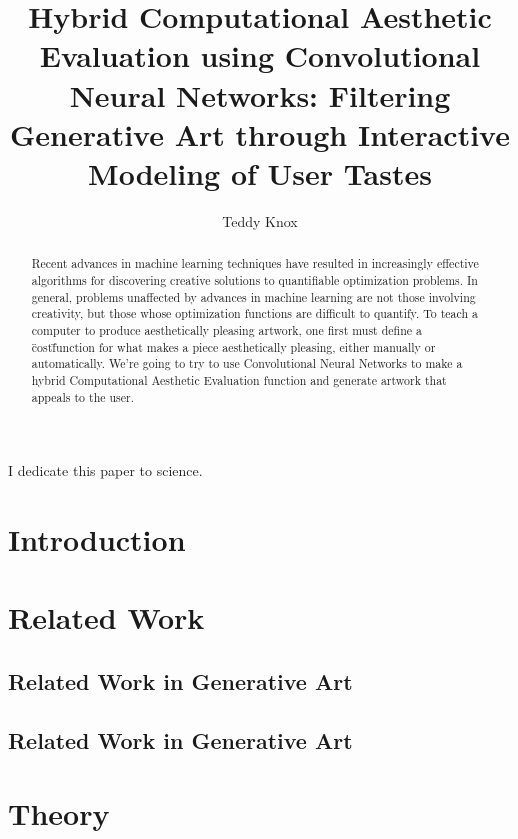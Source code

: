 \documentclass[midd]{thesis}
\title {Hybrid Computational Aesthetic Evaluation using Convolutional Neural Networks: Filtering Generative Art through Interactive Modeling of User Tastes}
\author {Teddy Knox}
\begin{document}
\maketitle

\begin{abstract}
Recent advances in machine learning techniques have resulted in increasingly effective algorithms for discovering creative
solutions to quantifiable optimization problems. In general, problems unaffected by advances in machine learning are not
those involving creativity, but those whose optimization functions are difficult to quantify. To teach a computer to
produce aesthetically pleasing artwork, one first must define a \"cost\" function for what makes a piece aesthetically
pleasing, either manually or automatically. We're going to try to use Convolutional Neural Networks to make a hybrid
Computational Aesthetic Evaluation function and generate artwork that appeals to the user.
\end{abstract}

\begin{acknowledgements}
I dedicate this paper to science.
\end{acknowledgements}

\contentspage
\tablelistpage
\figurelistpage

\normalspacing \setcounter{page}{1} 

\chapter{Introduction}
\label{sec:intro}

\chapter{Related Work}

\section{Related Work in Generative Art}

\section{Related Work in Generative Art}

\chapter{Theory}
\end{document}
